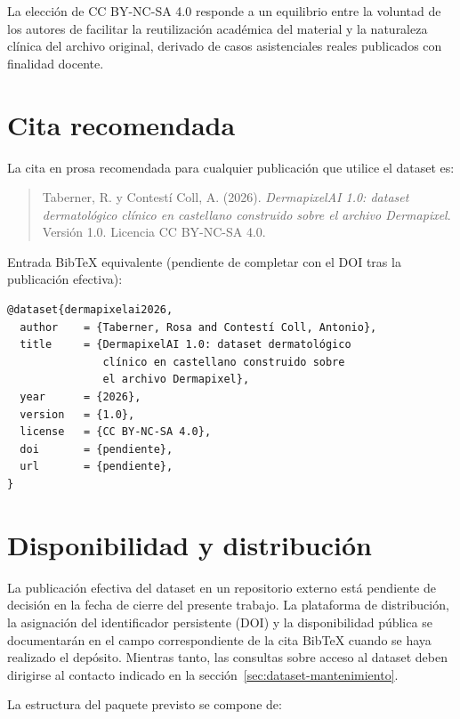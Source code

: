 La elección de CC BY-NC-SA 4.0 responde a un equilibrio entre la
voluntad de los autores de facilitar la reutilización académica
del material y la naturaleza clínica del archivo original, derivado
de casos asistenciales reales publicados con finalidad docente.

\section{Cita recomendada}
\label{sec:dataset-cita}

La cita en prosa recomendada para cualquier publicación que utilice
el dataset es:

\begin{quote}
Taberner, R. y Contestí Coll, A. (2026). \emph{DermapixelAI 1.0:
dataset dermatológico clínico en castellano construido sobre el
archivo Dermapixel}. Versión 1.0. Licencia CC BY-NC-SA 4.0.
\end{quote}

Entrada BibTeX equivalente (pendiente de completar con el DOI tras
la publicación efectiva):

\begin{verbatim}
@dataset{dermapixelai2026,
  author    = {Taberner, Rosa and Contestí Coll, Antonio},
  title     = {DermapixelAI 1.0: dataset dermatológico
               clínico en castellano construido sobre
               el archivo Dermapixel},
  year      = {2026},
  version   = {1.0},
  license   = {CC BY-NC-SA 4.0},
  doi       = {pendiente},
  url       = {pendiente},
}
\end{verbatim}

\section{Disponibilidad y distribución}
\label{sec:dataset-disponibilidad}

La publicación efectiva del dataset en un repositorio externo está
pendiente de decisión en la fecha de cierre del presente trabajo.
La plataforma de distribución, la asignación del identificador
persistente (DOI) y la disponibilidad pública se documentarán en el
campo correspondiente de la cita BibTeX cuando se haya realizado el
depósito. Mientras tanto, las consultas sobre acceso al dataset
deben dirigirse al contacto indicado en la
sección~\ref{sec:dataset-mantenimiento}.

La estructura del paquete previsto se compone de:

